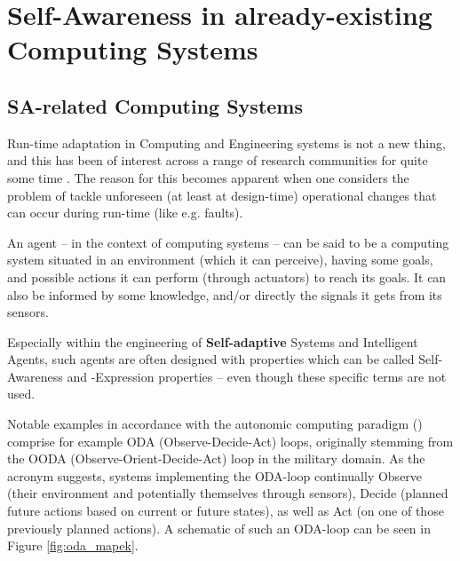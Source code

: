 


\section{Self-Awareness in already-existing Computing Systems}

	\subsection{SA-related Computing Systems}
	Run-time adaptation in Computing and Engineering systems is not a new thing, and this has been of interest across a range of research communities for quite some time \cite{sacs16_ch4}. The reason for this becomes apparent when one considers the problem of tackle unforeseen (at least at design-time) operational changes that can occur during run-time (like e.g. faults).

	An agent -- in the context of computing systems -- can be said to be a computing system situated in an environment (which it can perceive), having some goals, and possible actions it can perform (through actuators) to reach its goals. It can also be informed by some knowledge, and/or directly the signals it gets from its sensors.

	Especially within the engineering of \textbf{Self-adaptive} Systems and Intelligent Agents, such agents are often designed with properties which can be called Self-Awareness and -Expression properties -- even though these specific terms are not used.

	Notable examples in accordance with the autonomic computing paradigm (\cite{sacs16_ch4}) comprise for example ODA (Observe-Decide-Act) loops, originally stemming from the OODA (Observe-Orient-Decide-Act) loop in the military domain. As the acronym suggests, systems implementing the ODA-loop continually Observe (their environment and potentially themselves through sensors), Decide (planned future actions based on current or future states), as well as Act (on one of those previously planned actions). A schematic of such an ODA-loop can be seen in Figure \ref{fig:oda_mapek}.

